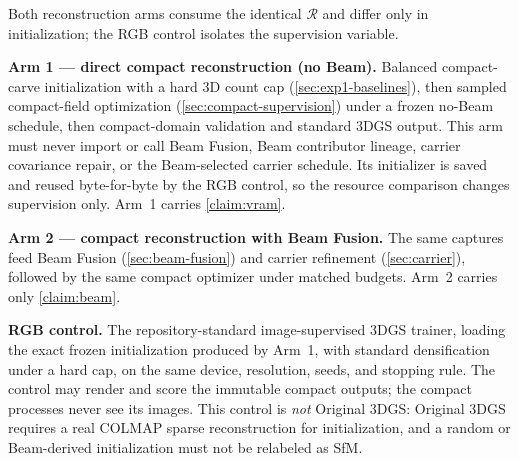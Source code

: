 \begin{figure}[t]
  \centering
  \caption{}
  \label{fig:teaser}
\end{figure}

Both reconstruction arms consume the identical $\mathcal{R}$ and differ only in
initialization; the RGB control isolates the supervision variable.

\textbf{Arm 1 --- direct compact reconstruction (no Beam).}
Balanced compact-carve initialization with a hard 3D count cap
(\cref{sec:exp1-baselines}), then sampled compact-field optimization
(\cref{sec:compact-supervision}) under a frozen no-Beam schedule, then compact-domain
validation and standard \mbox{3DGS} output.  This arm must never import or call Beam Fusion,
Beam contributor lineage, carrier covariance repair, or the Beam-selected carrier schedule.
Its initializer is saved and reused byte-for-byte by the RGB control, so the resource
comparison changes supervision only.  Arm~1 carries \cref{claim:vram}.

\textbf{Arm 2 --- compact reconstruction with Beam Fusion.}
The same captures feed Beam Fusion (\cref{sec:beam-fusion}) and carrier refinement
(\cref{sec:carrier}), followed by the same compact optimizer under matched budgets.  Arm~2
carries only \cref{claim:beam}.

\textbf{RGB control.}
The repository-standard image-supervised 3DGS trainer, loading the exact frozen initialization
produced by Arm~1, with standard densification under a hard cap, on the same device,
resolution, seeds, and stopping rule.  The control may render and score the immutable compact
outputs; the compact processes never see its images.  This control is \emph{not} Original 3DGS:
Original 3DGS requires a real COLMAP sparse reconstruction for initialization, and a random or
Beam-derived initialization must not be relabeled as SfM.

